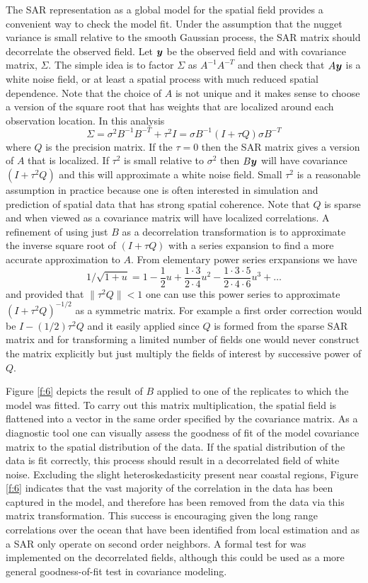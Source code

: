 \documentclass[review]{elsarticle}
\begin{document}
The SAR representation as a global model for  the spatial field provides a convenient way to check the model fit.   Under the assumption that the nugget variance is small relative to the smooth Gaussian process, the SAR matrix should  decorrelate the observed field. 
Let $\mbox{\boldmath $y$}$ be the observed field and with covariance matrix, $\Sigma$. The simple idea is to factor $\Sigma$ as $A^{-1} A^{-T}$ and then  check that $A\mbox{\boldmath $y$}$ is a white noise field, or at least a spatial process with much reduced  spatial dependence. 
Note that the choice of $A$ is not unique and it makes sense to choose a version of the square root that has weights that are localized around each observation location. In this analysis 
  \[ \Sigma=  \sigma^2 B^{-1} B^{-T} + \tau^2 I  = \sigma B^{-1}( I + \tau Q ) \sigma B^{-T} \]
where $Q$ is the precision matrix. If the $\tau= 0$ then the SAR matrix gives a version of $A$ that is localized. 
If $\tau^2$ is small relative to $\sigma^2$ then  $B\mbox{\boldmath $y$}$ will have covariance  $(I +  \tau^2Q)$ and this will approximate a white noise field. Small $\tau^2$ is a reasonable assumption in practice because one is often interested in simulation and prediction of spatial data that has strong spatial coherence. Note that $Q$ is sparse and when viewed as a covariance matrix will have localized correlations. A refinement of using just $B$ as a decorrelation transformation is  to approximate the inverse square root of $( I + \tau Q )$ with a series expansion to find a more accurate approximation to $A$. 
From elementary power series erxpansions we have 
\[ 1/\sqrt{ 1 + u} =  1  - \frac{1}{2}u + \frac{1\cdot 3}{2 \cdot 4} u^2 - \frac{1 \cdot 3 \cdot 5}{2 \cdot 4 \cdot 6} u^3 + \ldots \]
and provided that  $\| \tau^2 Q \| < 1$  one can use this power series to approximate  $(I + \tau^2 Q)^{-1/2}$  as a symmetric matrix.  For example a first order correction would be $I - (1/2) \tau^2 Q $ and it easily applied since $Q$ is formed from the sparse SAR matrix and for transforming a limited number of fields one would never construct the matrix explicitly but just multiply the fields of interest by successive power of $Q$.

Figure \ref{f:6} depicts the result of $B$ applied to one of the replicates to which the model was fitted. To carry out this matrix multiplication, the spatial field is flattened into a vector in the same order specified by the covariance matrix.  As a diagnostic tool one can  visually assess the goodness of fit of the model covariance matrix to the spatial distribution of the data. If the spatial distribution of the data is fit correctly, this process should result in a decorrelated field of white noise. Excluding the slight heteroskedasticity present near coastal regions, Figure \ref{f:6} indicates that the vast majority of the correlation in the data has been captured in the model, and therefore has been removed from the data via this matrix transformation. This success is encouraging given the long range correlations over the ocean that have been identified from local estimation and as a SAR only operate on second order neighbors.  A formal  test for  was implemented on the decorrelated fields, although this could be used as a more general goodness-of-fit test in covariance modeling.
\end{document}
